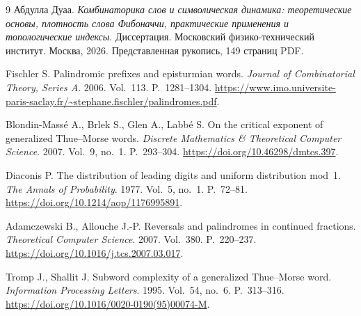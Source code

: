 \documentclass[12pt,a4paper]{article}
\begin{document}
\begin{thebibliography}{9}
\small
{}
Абдулла Дуаа.
\emph{Комбинаторика слов и символическая динамика:
теоретические основы, плотность слова Фибоначчи,
практические применения и топологические индексы}.
Диссертация. Московский физико-технический институт.
Москва, 2026. Представленная рукопись, 149 страниц PDF.

Fischler S.
Palindromic prefixes and episturmian words.
\emph{Journal of Combinatorial Theory, Series A}.
2006. Vol.~113. P.~1281--1304.
\url{https://www.imo.universite-paris-saclay.fr/~stephane.fischler/palindromes.pdf}.

Blondin-Massé A., Brlek S., Glen A., Labbé S.
On the critical exponent of generalized Thue--Morse words.
\emph{Discrete Mathematics \& Theoretical Computer Science}.
2007. Vol.~9, no.~1. P.~293--304.
\url{https://doi.org/10.46298/dmtcs.397}.

Diaconis P.
The distribution of leading digits and uniform distribution mod~1.
\emph{The Annals of Probability}.
1977. Vol.~5, no.~1. P.~72--81.
\url{https://doi.org/10.1214/aop/1176995891}.

Adamczewski B., Allouche J.-P.
Reversals and palindromes in continued fractions.
\emph{Theoretical Computer Science}.
2007. Vol.~380. P.~220--237.
\url{https://doi.org/10.1016/j.tcs.2007.03.017}.

Tromp J., Shallit J.
Subword complexity of a generalized Thue--Morse word.
\emph{Information Processing Letters}.
1995. Vol.~54, no.~6. P.~313--316.
\url{https://doi.org/10.1016/0020-0190(95)00074-M}.
\end{thebibliography}
\end{document}
